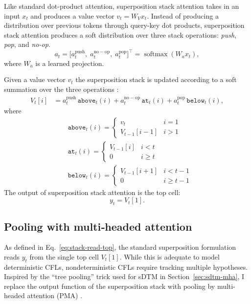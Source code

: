 Like standard dot-product attention, superposition stack attention takes in an input $x_t$ and produces a value vector $v_t=W_Vx_t$. Instead of producing a distribution over previous tokens through query-key dot products, superposition stack attention produces a soft distribution over three stack operations: \textit{push}, \textit{pop}, and \textit{no-op}.
\begin{equation}
  a_t = \bigl[a^{\mathrm{push}}_t,\;a^{\mathrm{no-op}}_t,\;a^{\mathrm{pop}}_t\bigr]^{\top} = \operatorname{softmax}(W_{a}x_{t}),
\end{equation}
where $W_{a}$ is a learned projection.

Given a value vector $v_t$ the superposition stack is updated according to a soft summation over the three operations \citep{joulin_inferring_2015}:
\begin{align}
 V_t[i] &= a^{\mathrm{push}}_t\,\texttt{above}_{t}(i)
          + a^{\mathrm{no-op}}_t\,\texttt{at}_{t}(i)
          + a^{\mathrm{pop}}_t\,\texttt{below}_{t}(i), \label{eq:stack-update}
\end{align}
where
\begin{align}
  &\texttt{above}_{t}(i)=\begin{cases}v_t & i=1\\V_{t-1}[i-1] & i>1\end{cases}\\
  &\texttt{at}_{t}(i)=\begin{cases}V_{t-1}[i] & i<t\\0 & i \geq t \end{cases}\\
  &\texttt{below}_{t}(i)=\begin{cases}V_{t-1}[i+1] & i<t-1\\ 0 & i\geq t-1\end{cases}
\end{align}
The output of superposition stack attention is the top cell:
\begin{equation}
  y_t = V_t[1]. \label{eq:stack-read-top}
\end{equation}

\subsection{Pooling with multi‑headed attention} \label{sec:stack-pooling}
As defined in Eq.~\ref{eq:stack-read-top}, the standard superposition formulation reads $y_t$ from the single top cell $V_t[1]$. While this is adequate to model deterministic CFLs, nondeterministic CFLs require tracking multiple hypotheses.  Inspired by the ``tree pooling'' trick used for sDTM in Section~\ref{sec:sdtm-mha}, I replace the output function of the superposition stack with pooling by multi-headed attention (PMA) \citep{lee_set_2019}.

